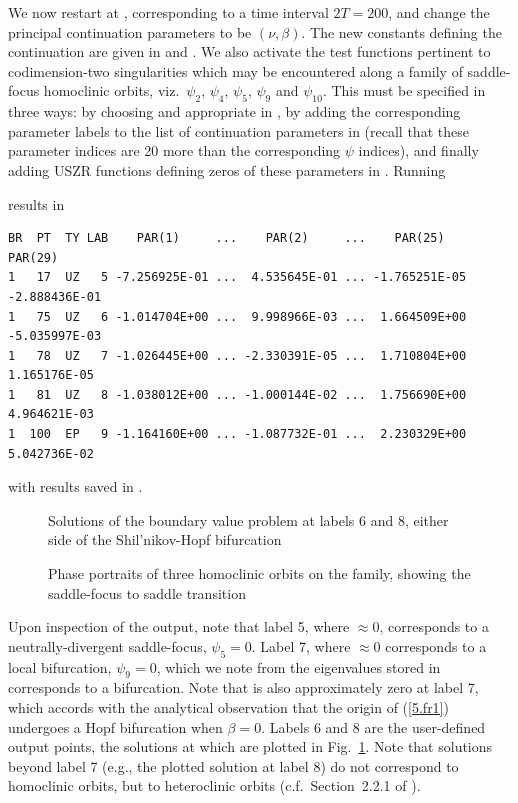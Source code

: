 \documentclass[12pt]{report}
\begin{document}
We now restart at , corresponding to a time interval $2T=200$,
and change the principal continuation parameters to be $(\nu,\beta)$.
The new constants defining the continuation are given in 
and .
We also activate the test functions pertinent to codimension-two
singularities which may be encountered along a family of saddle-focus
homoclinic orbits, viz.\ $\psi_2$, $\psi_4$, $\psi_5$, $\psi_9$ and $\psi_{10}$.
This must be specified in three ways: by choosing  and appropriate
 in , by adding the corresponding parameter labels
to the list of continuation parameters  in 
(recall that these parameter indices are 20 more than the corresponding
$\psi$ indices), and finally adding USZR functions defining zeros of
these parameters in . Running 
\begin{center}  
\end{center} 
results in
\begin{verbatim}
BR  PT  TY LAB    PAR(1)     ...    PAR(2)     ...    PAR(25)       PAR(29)    
1   17  UZ   5 -7.256925E-01 ...  4.535645E-01 ... -1.765251E-05 -2.888436E-01
1   75  UZ   6 -1.014704E+00 ...  9.998966E-03 ...  1.664509E+00 -5.035997E-03
1   78  UZ   7 -1.026445E+00 ... -2.330391E-05 ...  1.710804E+00  1.165176E-05
1   81  UZ   8 -1.038012E+00 ... -1.000144E-02 ...  1.756690E+00  4.964621E-03  
1  100  EP   9 -1.164160E+00 ... -1.087732E-01 ...  2.230329E+00  5.042736E-02
\end{verbatim}
with results saved in .
\begin{figure}[p]
\epsfysize 9.0cm
\centerline{}
\caption{Solutions of the boundary value problem at labels 6 and 8, 
either side of the Shil'nikov-Hopf bifurcation}
\label{Fcircuit1}
\end{figure}
\begin{figure}[p]
\epsfysize 9.0cm
\centerline{}
\caption{Phase portraits of three homoclinic orbits 
on the family, showing the saddle-focus to saddle transition}
\label{Fcircuit2}
\end{figure}
Upon inspection of the output, note that label 5, where $\approx 0$, 
corresponds to a neutrally-divergent saddle-focus, $\psi_5=0$. 
Label 7, where $\approx 0$ corresponds to a local bifurcation, $\psi_9=0$, 
which we note from the eigenvalues stored in  corresponds to a  bifurcation. Note that  is also approximately zero
at label 7, which accords with the analytical observation that the origin of
(\ref{5.fr1}) undergoes a Hopf bifurcation when $\beta=0$.
Labels 6 and 8 are the user-defined output
points, the solutions at which are plotted in Fig.\ \ref{Fcircuit1}.
Note that solutions beyond label 7 (e.g., the plotted solution
at label 8) do not correspond to homoclinic orbits, but to 
 heteroclinic orbits (c.f.\ Section~2.2.1 of
).
\end{document}
